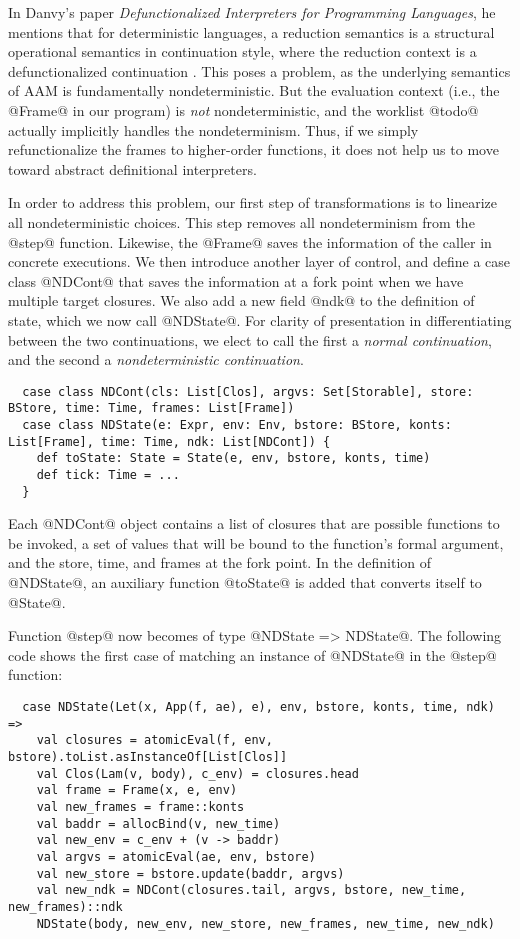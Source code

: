 \documentclass[acmsmall, review]{acmart}\settopmatter{}
\begin{document}
In Danvy's paper \textit{Defunctionalized Interpreters for Programming
  Languages}, he mentions that for deterministic languages, a reduction semantics
is a structural operational semantics in continuation style, where the reduction
context is a defunctionalized continuation \cite{Danvy:2008:DIP:1411204.1411206}.
This poses a problem, as the underlying semantics of AAM is fundamentally nondeterministic.
But the evaluation context (i.e., the @Frame@ in our program) is \emph{not}
nondeterministic, and the worklist @todo@ actually implicitly handles the nondeterminism.
Thus, if we simply refunctionalize the frames to higher-order functions, 
it does not help us to move toward abstract definitional interpreters.

In order to address this problem, our first step of transformations
is to linearize all nondeterministic choices.
This step removes all nondeterminism from the @step@ function.
Likewise, the @Frame@ saves the information of the caller in concrete executions.
We then introduce another layer of control, and define a case class @NDCont@
that saves the information at a fork point when we have multiple target closures.
We also add a new field @ndk@ to the definition of state, which we now call @NDState@.
For clarity of presentation in differentiating between the two continuations, we elect to call
the first a \emph{normal continuation}, and the second a \emph{nondeterministic continuation}.

\begin{lstlisting}
  case class NDCont(cls: List[Clos], argvs: Set[Storable], store: BStore, time: Time, frames: List[Frame])
  case class NDState(e: Expr, env: Env, bstore: BStore, konts: List[Frame], time: Time, ndk: List[NDCont]) {
    def toState: State = State(e, env, bstore, konts, time)
    def tick: Time = ...
  }
\end{lstlisting}

Each @NDCont@ object contains a list of closures that are possible functions to be invoked,
a set of values that will be bound to the function's formal argument,
and the store, time, and frames at the fork point.
In the definition of @NDState@, an auxiliary function @toState@ is added that
converts itself to @State@.

Function @step@ now becomes of type @NDState => NDState@.
The following code shows the first case of matching an instance of @NDState@ in
the @step@ function:

\begin{lstlisting}
  case NDState(Let(x, App(f, ae), e), env, bstore, konts, time, ndk) =>
    val closures = atomicEval(f, env, bstore).toList.asInstanceOf[List[Clos]]
    val Clos(Lam(v, body), c_env) = closures.head
    val frame = Frame(x, e, env)
    val new_frames = frame::konts
    val baddr = allocBind(v, new_time)
    val new_env = c_env + (v -> baddr)
    val argvs = atomicEval(ae, env, bstore)
    val new_store = bstore.update(baddr, argvs)
    val new_ndk = NDCont(closures.tail, argvs, bstore, new_time, new_frames)::ndk
    NDState(body, new_env, new_store, new_frames, new_time, new_ndk)
\end{lstlisting}
\end{document}

